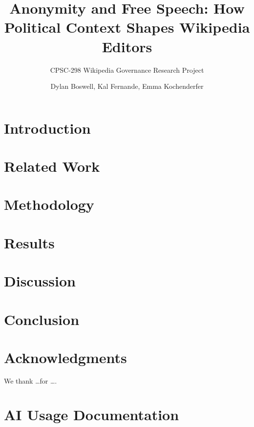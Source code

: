 \documentclass[sigconf,screen]{acmart}
\title{Anonymity and Free Speech: How Political Context Shapes Wikipedia Editors}
\subtitle{CPSC-298 Wikipedia Governance Research Project}
\author{Dylan Boswell, Kal Fernande, Emma Kochenderfer}
\affiliation{%
  \institution{Chapman University}
  \city{Orange}
  \country{USA}
}
\begin{document}
\maketitle

\section{Introduction}


\section{Related Work}


\section{Methodology}


\section{Results}


\section{Discussion}


\section{Conclusion}


\section*{Acknowledgments}
We thank \dots for \ldots.




\appendix
\section{AI Usage Documentation}

\end{document}
